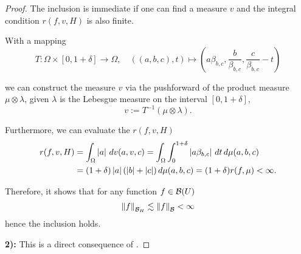 \begin{proof}
The inclusion is immediate if one can find a measure $v$ and the integral
condition $r(f, v, H)$ is also finite.

With a mapping
\begin{equation}
    T: \Omega \times [0,1+\delta] \to \Omega, \quad 
    ((a,b,c), t) \mapsto
    (a\beta_{b,c}, \frac{b}{\beta_{b,c}}, \frac{c}{\beta_{b,c}} - t)
\end{equation}

 we can construct the measure $v$ via the pushforward of the product measure
$\mu\otimes\lambda$, given $\lambda$ is the Lebesgue measure on the interval
$[0,1+\delta]$,
\begin{equation}
    v := T^{-1}(\mu\otimes\lambda).
\end{equation}

Furthermore, we can evaluate the $r(f, v, H)$
\begin{align}
    r(f, v, H) 
    &= \int_{\Omega} \left| a \right| \,dv(a,v,c) 
    = \int_{\Omega}\int_0^{1+\delta} \left| a\beta_{b,c} \right| \,dt\,d\mu(a,b,c) \\
    &= (1+\delta) \left| a \right|(\left| b \right| + \left| c \right|) \,d\mu(a,b,c)
    = (1+\delta) r(f,\mu) < \infty.
\end{align}

Therefore, it shows that for any function $f \in \mathcal{B}(U)$
\begin{equation}
    \left\| f \right\|_{\mathcal{B}_H} \lesssim \left\| f \right\|_{\mathcal{B}} < \infty
\end{equation}
hence the inclusion holds.

\textbf{2):} This is a direct consequence of \cite[Theorem
2]{barronNeuralNetApproximation1992}.




\end{proof}
